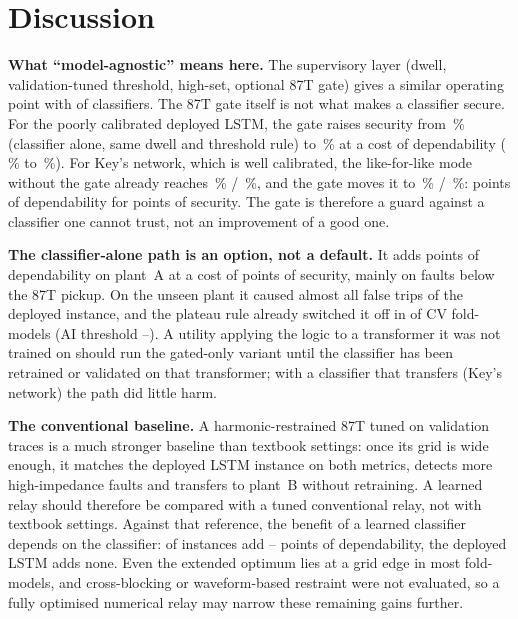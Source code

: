 \documentclass[preprint,12pt]{elsarticle}
\begin{document}
\section{Discussion}
\label{sec:discussion}
\textbf{What ``model-agnostic'' means here.} The supervisory layer (dwell, validation-tuned threshold, high-set, optional 87T gate) gives a similar operating point with \nClsGood{} of \nClsAll{} classifiers. The 87T gate itself is not what makes a classifier secure. For the poorly calibrated deployed LSTM, the gate raises security from \secAlone\,\% (classifier alone, same dwell and threshold rule) to \secDep\,\% at a cost of dependability (\depAlone\,\% to \depDep\,\%). For Key's network, which is well calibrated, the like-for-like mode without the gate already reaches \depKeyL\,\% / \secKeyL\,\%, and the gate moves it to \depKeyH\,\% / \secKeyH\,\%: \keyGateCost{} points of dependability for \keyGateSec{} points of security. The gate is therefore a guard against a classifier one cannot trust, not an improvement of a good one.

\textbf{The classifier-alone path is an option, not a default.} It adds \gatedDepLoss{} points of dependability on plant~A at a cost of \gatedSecGain{} points of security, mainly on faults below the 87T pickup. On the unseen plant it caused almost all false trips of the deployed instance, and the plateau rule already switched it off in \soloOff{} of \nFoldModels{} CV fold-models (AI threshold \aiMin--\aiMax). A utility applying the logic to a transformer it was not trained on should run the gated-only variant until the classifier has been retrained or validated on that transformer; with a classifier that transfers (Key's network) the path did little harm.

\textbf{The conventional baseline.} A harmonic-restrained 87T tuned on validation traces is a much stronger baseline than textbook settings: once its grid is wide enough, it matches the deployed LSTM instance on both metrics, detects more high-impedance faults and transfers to plant~B without retraining. A learned relay should therefore be compared with a tuned conventional relay, not with textbook settings. Against that reference, the benefit of a learned classifier depends on the classifier: \kSigX{} of \nInst{} instances add \aGainX--\bGainX{} points of dependability, the deployed LSTM adds none. Even the extended optimum lies at a grid edge in most fold-models, and cross-blocking or waveform-based restraint were not evaluated, so a fully optimised numerical relay may narrow these remaining gains further.
\end{document}
